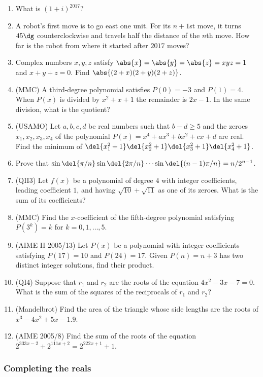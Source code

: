 \documentclass[10pt,paper=letter]{scrartcl}
\begin{document}
\begin{enumerate}
  \item What is $(1 + i)^{2017}$?
  \item A robot's first move is to go east one unit. For its $n+1$st move, it turns $45\dg$ counterclockwise and travels half the distance of the $n$th move. How far is the robot from where it started after $2017$ moves?
  \item Complex numbers $x, y, z$ satisfy $\abs{x} = \abs{y} = \abs{z} = xyz = 1$ and $x + y + z = 0$. Find $\abs{(2+x)(2+y)(2+z)}$.
  \item (MMC) A third-degree polynomial satisfies $P(0) = -3$ and $P(1) = 4$. When $P(x)$ is divided by $x^2 + x + 1$ the remainder is $2x - 1$. In the same division, what is the quotient?
  \item (USAMO) Let $a, b, c, d$ be real numbers such that $b - d \geq 5$ and the zeroes $x_1, x_2, x_3, x_4$ of the polynomial $P(x) = x^4 + ax^3 + bx^2 + cx + d$ are real. Find the minimum of $\del{x_1^2 + 1}\del{x_2^2 + 1}\del{x_3^2 + 1}\del{x_4^2 + 1}$.
  \item Prove that $\sin\del{\pi/n}\sin\del{2\pi/n}\cdots\sin\del{(n-1)\pi/n} = n/2^{n-1}$.
  \item (QII3) Let $f(x)$ be a polynomial of degree $4$ with integer coefficients, leading coefficient $1$, and having $\sqrt{10} + \sqrt{11}$ as one of its zeroes. What is the sum of its coefficients?
  \item (MMC) Find the $x$-coefficient of the fifth-degree polynomial satisfying $P(3^k) = k$ for $k = 0, 1, \ldots, 5$.
  \item (AIME II 2005/13) Let $P(x)$ be a polynomial with integer coefficients satisfying $P(17) = 10$ and $P(24) = 17$. Given $P(n) = n + 3$ has two distinct integer solutions, find their product.
  \item (QI4) Suppose that $r_1$ and $r_2$ are the roots of the equation $4x^2 - 3x - 7 = 0$. What is the sum of the squares of the reciprocals of $r_1$ and $r_2$?
  \item (Mandelbrot) Find the area of the triangle whose side lengths are the roots of $x^3 - 4x^2 + 5x - 1.9$.
  \item (AIME 2005/8) Find the sum of the roots of the equation $2^{333x-2} + 2^{111x+2} = 2^{222x+1} + 1$.
\end{enumerate}

\subsubsection*{Completing the reals}
\end{document}
